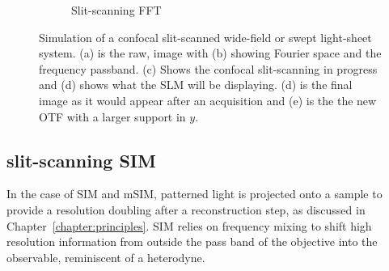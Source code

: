 \begin{figure}[h]
\begin{subfigure}[t]{0.23\textwidth}
      \caption{Slit-scanning \gls{FFT}}
  \end{subfigure}
  \caption{Simulation of a confocal slit-scanned wide-field or swept light-sheet system.
  (a) is the raw, image with (b) showing Fourier space and the frequency passband.
  (c) Shows the confocal \gls{slit-scanning} in progress and (d) shows what the \gls{SLM} will be displaying.
  (d) is the final image as it would appear after an acquisition and (e) is the the new \gls{OTF} with a larger support in \(y\).
  }
  \label{fig:widefield_slit}
\end{figure}

\subsection{\Gls{slit-scanning} \gls{SIM}}

In the case of \gls{SIM} and \gls{mSIM}, patterned light is projected onto a sample to provide a resolution doubling after a reconstruction step, as discussed in Chapter~\ref{chapter:principles}.
\gls{SIM} relies on frequency mixing to shift high resolution information from outside the pass band of the objective into the observable, reminiscent of a heterodyne.

